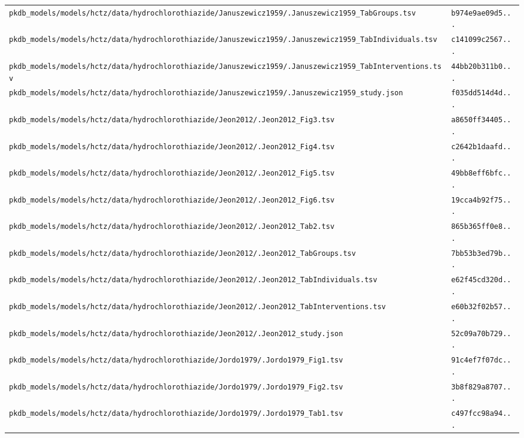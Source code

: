 \documentclass{article}
\begin{document}
\begin{longtable}{ll}
\texttt{pkdb\_models/models/hctz/data/hydrochlorothiazide/Januszewicz1959/.Januszewicz1959\_TabGroups.tsv} & \texttt{b974e9ae09d5...} \\
\texttt{pkdb\_models/models/hctz/data/hydrochlorothiazide/Januszewicz1959/.Januszewicz1959\_TabIndividuals.tsv} & \texttt{c141099c2567...} \\
\texttt{pkdb\_models/models/hctz/data/hydrochlorothiazide/Januszewicz1959/.Januszewicz1959\_TabInterventions.tsv} & \texttt{44bb20b311b0...} \\
\texttt{pkdb\_models/models/hctz/data/hydrochlorothiazide/Januszewicz1959/.Januszewicz1959\_study.json} & \texttt{f035dd514d4d...} \\
\texttt{pkdb\_models/models/hctz/data/hydrochlorothiazide/Jeon2012/.Jeon2012\_Fig3.tsv} & \texttt{a8650ff34405...} \\
\texttt{pkdb\_models/models/hctz/data/hydrochlorothiazide/Jeon2012/.Jeon2012\_Fig4.tsv} & \texttt{c2642b1daafd...} \\
\texttt{pkdb\_models/models/hctz/data/hydrochlorothiazide/Jeon2012/.Jeon2012\_Fig5.tsv} & \texttt{49bb8eff6bfc...} \\
\texttt{pkdb\_models/models/hctz/data/hydrochlorothiazide/Jeon2012/.Jeon2012\_Fig6.tsv} & \texttt{19cca4b92f75...} \\
\texttt{pkdb\_models/models/hctz/data/hydrochlorothiazide/Jeon2012/.Jeon2012\_Tab2.tsv} & \texttt{865b365ff0e8...} \\
\texttt{pkdb\_models/models/hctz/data/hydrochlorothiazide/Jeon2012/.Jeon2012\_TabGroups.tsv} & \texttt{7bb53b3ed79b...} \\
\texttt{pkdb\_models/models/hctz/data/hydrochlorothiazide/Jeon2012/.Jeon2012\_TabIndividuals.tsv} & \texttt{e62f45cd320d...} \\
\texttt{pkdb\_models/models/hctz/data/hydrochlorothiazide/Jeon2012/.Jeon2012\_TabInterventions.tsv} & \texttt{e60b32f02b57...} \\
\texttt{pkdb\_models/models/hctz/data/hydrochlorothiazide/Jeon2012/.Jeon2012\_study.json} & \texttt{52c09a70b729...} \\
\texttt{pkdb\_models/models/hctz/data/hydrochlorothiazide/Jordo1979/.Jordo1979\_Fig1.tsv} & \texttt{91c4ef7f07dc...} \\
\texttt{pkdb\_models/models/hctz/data/hydrochlorothiazide/Jordo1979/.Jordo1979\_Fig2.tsv} & \texttt{3b8f829a8707...} \\
\texttt{pkdb\_models/models/hctz/data/hydrochlorothiazide/Jordo1979/.Jordo1979\_Tab1.tsv} & \texttt{c497fcc98a94...} \\

\end{longtable}
\end{document}
